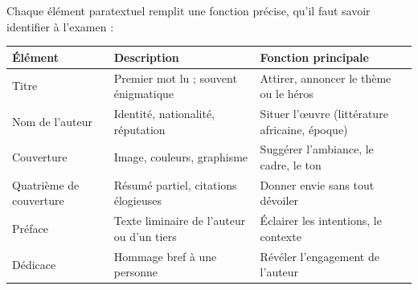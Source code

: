 \documentclass[11pt]{article}
\begin{document}
Chaque élément paratextuel remplit une fonction précise, qu'il faut savoir identifier à l'examen :

\begin{center}
\begin{tabularx}{\linewidth}{|l|X|X|}
\hline
\rowcolor{popblueL} \textbf{Élément} & \textbf{Description} & \textbf{Fonction principale} \\
\hline
Titre & Premier mot lu ; souvent énigmatique & Attirer, annoncer le thème ou le héros \\
\hline
Nom de l'auteur & Identité, nationalité, réputation & Situer l'œuvre (littérature africaine, époque) \\
\hline
Couverture & Image, couleurs, graphisme & Suggérer l'ambiance, le cadre, le ton \\
\hline
Quatrième de couverture & Résumé partiel, citations élogieuses & Donner envie sans tout dévoiler \\
\hline
Préface & Texte liminaire de l'auteur ou d'un tiers & Éclairer les intentions, le contexte \\
\hline
Dédicace & Hommage bref à une personne & Révéler l'engagement de l'auteur \\
\hline
\end{tabularx}
\end{center}
\end{document}
